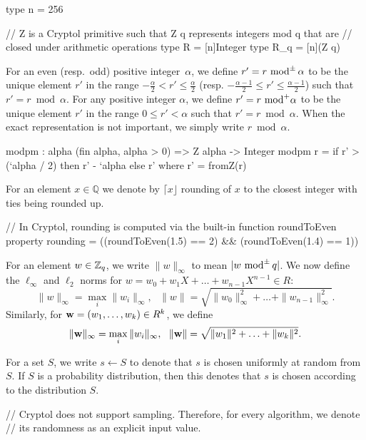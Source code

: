 \begin{code}
  type n = 256

  // Z is a Cryptol primitive such that Z q represents integers mod q that are 
  // closed under arithmetic operations
  type R = [n]Integer
  type R_q = [n](Z q)
\end{code}


For an even (resp.\ odd) positive integer~$\alpha$, 
we define $r'=r\text{ mod}^\pm\, \alpha$ to be the unique element 
$r'$ in the range $-\frac{\alpha}{2}<r'\leq\frac{\alpha}{2}$ 
(resp. $-\frac{\alpha-1}{2}\leq r'\leq \frac{\alpha-1}{2}$) such that $r'=r\bmod \alpha$. 
For any positive integer $\alpha$, 
we define $r'=r\text{ mod}^+ \alpha$ to be the unique element $r'$ 
in the range $0\leq r'<\alpha$ such that $r'=r\bmod \alpha$. 
When the exact representation is not important, we simply write $r\bmod \alpha$.  

\begin{code}
  modpm : {alpha} (fin alpha, alpha > 0) => Z alpha -> Integer
  modpm r = if r' > (`alpha / 2) then r' - `alpha else r'
    where r' = fromZ(r)
\end{code}

For an element $x \in \mathbb{Q}$ we denote by $\lceil x \rfloor$ 
rounding of $x$ to the closest integer with ties being rounded up.

\begin{code}
  // In Cryptol, rounding is computed via the built-in function roundToEven
  property rounding = ((roundToEven(1.5) == 2) && (roundToEven(1.4) == 1))
\end{code}

For an element $w\in\mathbb{Z}_q$, we write $\|w\|_\infty$ to mean $|w\text{ mod}^\pm\, q|$.  
We now define the $\ell_\infty$ and $\ell_2$ norms for 
$w=w_0+w_1X+\ldots +w_{n-1}X^{n-1}\in R$: 
$$\|w\|_\infty=\max_{i}{\|w_i\|_\infty},\,\,\,\, \|w\|=\sqrt{\|w_0\|_\infty^2+\ldots+\|w_{n-1}\|_\infty^2}.$$   
Similarly, for $\mathbf{w}=(w_1,\ldots,w_k)\in R^k$, we define 
$$\|\mathbf{w}\|_\infty=\max_{i}{\|w_i\|_\infty},\,\,\,\, \|\mathbf{w}\|=\sqrt{\|w_1\|^2+\ldots+\|w_k\|^2}.$$

For a set $S$, we write $s\gets S$ to denote that $s$ is chosen uniformly at random from $S$.  
If $S$ is a probability distribution, then this denotes that $s$ is chosen according to the distribution $S$.  

\begin{code}
  // Cryptol does not support sampling. Therefore, for every algorithm, we denote
  // its randomness as an explicit input value.
\end{code}

